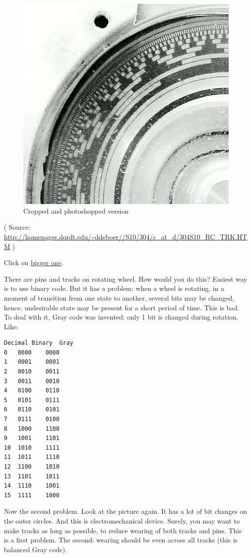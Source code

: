 \begin{figure}[H]
\centering
\includegraphics[scale=0.8]{SMT/gray/Rotary_Encoder_track_detail_scaled_crop.jpg}
\caption{Cropped and photoshopped version}
\end{figure}

( Source: \url{http://homepages.dordt.edu/~ddeboer//S10/304/c_at_d/304S10_RC_TRK.HTM} )

Click on
\href{https://raw.githubusercontent.com/dennis714/yurichev.com/master/blog/gray/Rotary_Encoder_track_detail.jpg}{bigger one}.

There are pins and tracks on rotating wheel.
How would you do this?
Easiest way is to use binary code.
But it has a problem: when a wheel is rotating, in a moment of transition from one state to another, several bits may be changed, hence, undesirable state may be present for a short period of time.
This is bad.
To deal with it, Gray code was invented: only 1 bit is changed during rotation.
Like:

\begin{lstlisting}
Decimal Binary  Gray
0 	0000 	0000
1 	0001 	0001
2 	0010 	0011
3 	0011 	0010
4 	0100 	0110
5 	0101 	0111
6 	0110 	0101
7 	0111 	0100
8 	1000 	1100
9 	1001 	1101
10 	1010 	1111
11 	1011 	1110
12 	1100 	1010
13 	1101 	1011
14 	1110 	1001
15 	1111 	1000
\end{lstlisting}

Now the second problem. Look at the picture again. It has a lot of bit changes on the outer circles.
And this is electromechanical device.
Surely, you may want to make tracks as long as possible, to reduce wearing of both tracks and pins.
This is a first problem.
The second: wearing should be even across all tracks (this is balanced Gray code).

